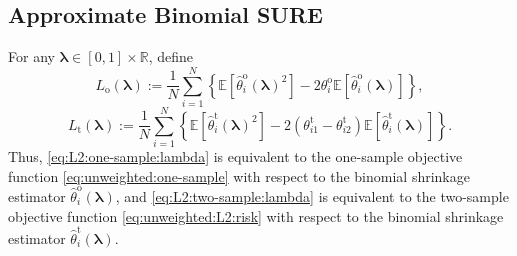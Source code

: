 \documentclass[12pt,letterpaper]{article}
\newcommand{\indep}{\ \raisebox{0.05em}{\rotatebox[origin=c]{90}{$\models$}} \ }
\newtheorem{corollary}{Corollary}[section]
\begin{document}
\subsection{Approximate Binomial SURE}
For any $\boldsymbol{\lambda}\in[0,1]\times\mathbb{R}$, define 
\begin{equation}\label{eq:L2:one-sample:lambda}
    L_{\mathrm{o}}(\boldsymbol{\lambda}):=\frac{1}{N}\sum_{i=1}^N\left\{\mathbb{E}\left[\hat{\theta}_i^{\mathrm{o}}(\boldsymbol{\lambda})^2\right]-2\theta_i^{\mathrm{o}}\mathbb{E}\left[\hat{\theta}_i^{\mathrm{o}}(\boldsymbol{\lambda})\right]\right\},
\end{equation}
\begin{equation}\label{eq:L2:two-sample:lambda}
    L_{\mathrm{t}}(\boldsymbol{\lambda}):=\frac{1}{N}\sum_{i=1}^N\left\{\mathbb{E}\left[\hat{\theta}_i^{\mathrm{t}}(\boldsymbol{\lambda})^2\right]-2(\theta_{i1}^{\mathrm{t}}-\theta_{i2}^{\mathrm{t}})\mathbb{E}\left[\hat{\theta}_i^{\mathrm{t}}(\boldsymbol{\lambda})\right]\right\}.
\end{equation}
Thus, \eqref{eq:L2:one-sample:lambda} is equivalent to the one-sample objective function \eqref{eq:unweighted:one-sample} with respect to the binomial shrinkage estimator $\hat{\theta}_i^{\mathrm{o}}(\boldsymbol{\lambda})$, and \eqref{eq:L2:two-sample:lambda} is equivalent to the two-sample objective function \eqref{eq:unweighted:L2:risk} with respect to the binomial shrinkage estimator $\hat{\theta}_i^{\mathrm{t}}(\boldsymbol{\lambda})$.
\end{document}

